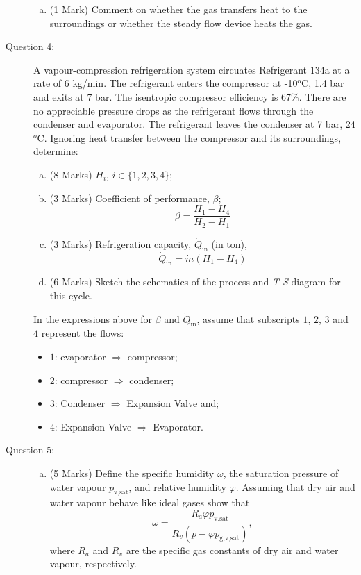 \documentclass[12pt,twoside]{report}
\newcommand{\frc}{\displaystyle\frac}
\begin{document}
\begin{description}
\begin{enumerate}[(a)]
\item (1 Mark) Comment on whether the gas transfers heat to the surroundings or whether the steady flow device heats the gas.
\end{enumerate} 

\item [Question 4:] A vapour-compression refrigeration system circuates Refrigerant 134a at a rate of 6 kg/min. The refrigerant enters the compressor at -10$^{\text{o}}$C, 1.4 bar and exits at 7 bar. The isentropic compressor efficiency is 67$\%$. There are no appreciable pressure drops as the refrigerant flows through the condenser and evaporator. The refrigerant leaves the condenser at 7 bar, 24$^{o}$C. Ignoring heat transfer between the compressor and its surroundings, determine:
\begin{enumerate}[(a)]
\item (8 Marks) $H_{i}$, $i\in\{1,2,3,4\}$;
\item (3 Marks) Coefficient of performance, $\beta$;
\begin{displaymath}
\beta = \frc{H_{1}-H_{4}}{H_{2}-H_{1}}
\end{displaymath}
\item (3 Marks) Refrigeration capacity, $\dot{Q}_{\text{in}}$ (in ton),
\begin{displaymath}
\dot{Q}_{\text{in}}=\dot{m}\left(H_{1}-H_{4}\right)
\end{displaymath}
\item (6 Marks) Sketch the schematics of the process and {\it T-S} diagram for this cycle.
\end{enumerate}
In the expressions above for $\beta$ and $\dot{Q}_{\text{in}}$, assume that subscripts $1$, $2$, $3$ and $4$ represent the flows:
\begin{itemize}
\item $1$: evaporator $\Rightarrow$ compressor; 
\item $2$: compressor $\Rightarrow$ condenser; 
\item $3$: Condenser $\Rightarrow$  Expansion Valve and; 
\item $4$: Expansion Valve $\Rightarrow$   Evaporator.
\end{itemize}


\item [Question 5:] \mbox{}
\begin{enumerate}[(a)] 
\item (5 Marks) Define the specific humidity $\omega$, the saturation pressure of water vapour $p_{\text{v,sat}}$, and relative humidity $\varphi$. Assuming that dry air and water vapour behave like ideal gases show that
\begin{displaymath}
\omega = \frc{R_{a}\varphi p_{\text{v,sat}}}{R_{v}\left(p - \varphi p_{\text{g,v,sat}}\right)},
\end{displaymath}
where $R_{a}$ and $R_{v}$ are the specific gas constants of dry air and water vapour, respectively. 
\medskip


\end{enumerate}
\end{description}
\end{document}
